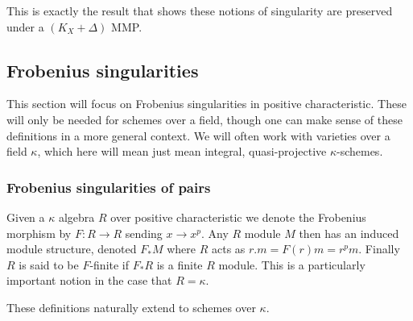 This is exactly the result that shows these notions of singularity are preserved under a $(K_{X}+\Delta)$ MMP.


%	

\subsection{Frobenius singularities}

This section will focus on Frobenius singularities in positive characteristic. These will only be needed for schemes over a field, though one can make sense of these definitions in a more general context. We will often work with varieties over a field $\kappa$, which here will mean just mean integral, quasi-projective $\kappa$-schemes.

\subsubsection{Frobenius singularities of pairs}

\begin{definition}
Given a $\kappa$ algebra $R$ over positive characteristic we denote the Frobenius morphism by $F:R\to R$ sending $x \to x^{p}$. Any $R$ module $M$ then has an induced module structure, denoted $F_{*}M$ where $R$ acts as $r.m=F(r)m=r^{p}m$. Finally $R$ is said to be $F$-finite if $F_{*}R$ is a finite $R$ module. This is a particularly important notion in the case that $R=\kappa$.

These definitions naturally extend to schemes over $\kappa$. 
\end{definition}

